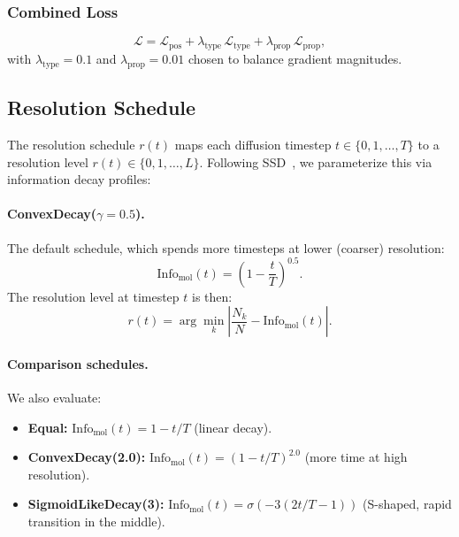 \documentclass[12pt,a4paper]{article}
\newcommand{\Info}{\mathrm{Info}}
\newcommand{\cL}{\mathcal{L}}
\begin{document}
\subsubsection{Combined Loss}

\begin{equation}\label{eq:loss_total}
    \cL = \cL_{\text{pos}} + \lambda_{\text{type}}\, \cL_{\text{type}} + \lambda_{\text{prop}}\, \cL_{\text{prop}},
\end{equation}
with $\lambda_{\text{type}} = 0.1$ and $\lambda_{\text{prop}} = 0.01$ chosen to balance gradient magnitudes.

\subsection{Resolution Schedule}\label{sec:resolution_schedule}

The resolution schedule $r(t)$ maps each diffusion timestep $t \in \{0, 1, \ldots, T\}$ to a resolution level $r(t) \in \{0, 1, \ldots, L\}$. Following SSD~\cite{ssd2026}, we parameterize this via information decay profiles:

\paragraph{ConvexDecay($\gamma = 0.5$).} The default schedule, which spends more timesteps at lower (coarser) resolution:
\begin{equation}\label{eq:convex_decay}
    \Info_{\mathrm{mol}}(t) = \left(1 - \frac{t}{T}\right)^{0.5}.
\end{equation}
The resolution level at timestep $t$ is then:
\begin{equation}\label{eq:r_from_info}
    r(t) = \arg\min_k \left|\frac{N_k}{N} - \Info_{\mathrm{mol}}(t)\right|.
\end{equation}

\paragraph{Comparison schedules.} We also evaluate:
\begin{itemize}
    \item \textbf{Equal:} $\Info_{\mathrm{mol}}(t) = 1 - t/T$ (linear decay).
    \item \textbf{ConvexDecay(2.0):} $\Info_{\mathrm{mol}}(t) = (1 - t/T)^{2.0}$ (more time at high resolution).
    \item \textbf{SigmoidLikeDecay(3):} $\Info_{\mathrm{mol}}(t) = \sigma(-3(2t/T - 1))$ (S-shaped, rapid transition in the middle).
\end{itemize}
\end{document}
